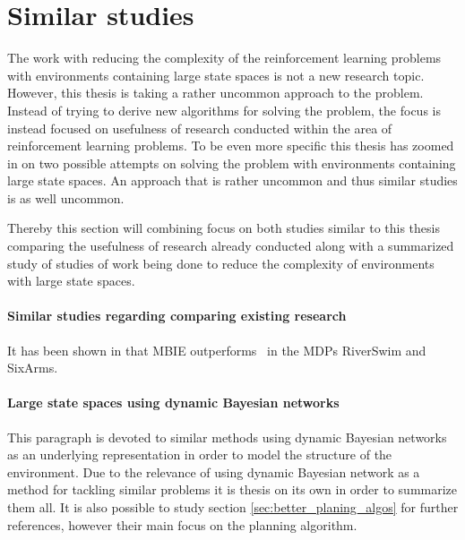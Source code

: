 \section{Similar studies }

The work with reducing the complexity of the reinforcement learning problems
with environments containing large state spaces is not a new research topic.
However, this thesis is taking a rather uncommon approach to the problem.
Instead of trying to derive new algorithms for solving the problem, the focus
is instead focused on usefulness of research conducted within the area of
reinforcement learning problems. To be even more specific this thesis has
zoomed in on two possible attempts on solving the problem with environments
containing large state spaces. An approach that is rather uncommon and thus
similar studies is as well uncommon. 


Thereby this section will combining focus on both studies similar to this
thesis comparing the usefulness of research already conducted along with a
summarized study of studies of work being done to reduce the complexity of
environments with large state spaces.


\paragraph{Similar studies regarding comparing existing research}


It has been shown in \parencite{strehl2004empirical} that MBIE outperforms
\etre\ in the MDPs RiverSwim and SixArms. \parencite{dietterich2013pac}


\paragraph{Large state spaces using dynamic Bayesian networks}

This paragraph is devoted to similar methods using dynamic Bayesian networks as an underlying representation in order to model the structure of the environment. Due to the relevance of using dynamic Bayesian network as a method for tackling similar problems it is thesis on its own in order to summarize them all. It is also possible to study section \ref{sec:better_planing_algos} for further references, however their main focus on the planning algorithm.

